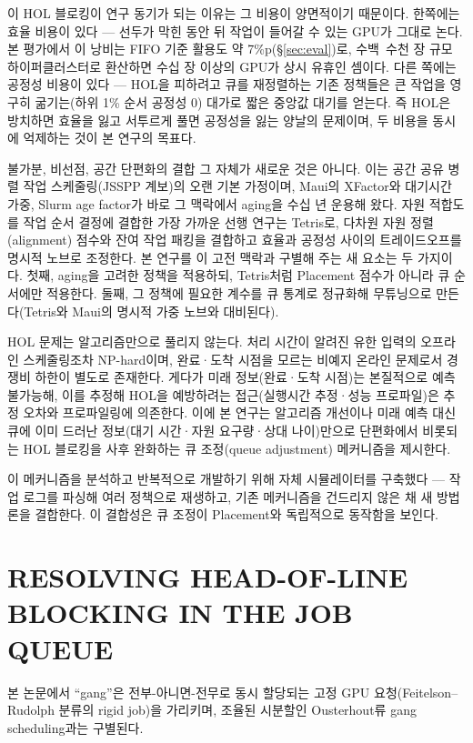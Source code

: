\documentclass{ieeetj}
\begin{document}
이 HOL 블로킹이 연구 동기가 되는 이유는 그 비용이 양면적이기 때문이다. 한쪽에는 효율 비용이 있다 --- 선두가 막힌 동안 뒤 작업이 들어갈 수 있는 GPU가 그대로 논다. 본 평가에서 이 낭비는 FIFO 기준 활용도 약 7\%p(\S\ref{sec:eval})로, 수백~수천 장 규모 하이퍼클러스터로 환산하면 수십 장 이상의 GPU가 상시 유휴인 셈이다. 다른 쪽에는 공정성 비용이 있다 --- HOL을 피하려고 큐를 재정렬하는 기존 정책들은 큰 작업을 영구히 굶기는(하위 1\% 순서 공정성 0) 대가로 짧은 중앙값 대기를 얻는다. 즉 HOL은 방치하면 효율을 잃고 서투르게 풀면 공정성을 잃는 양날의 문제이며, 두 비용을 동시에 억제하는 것이 본 연구의 목표다.

불가분, 비선점, 공간 단편화의 결합 그 자체가 새로운 것은 아니다. 이는 공간 공유 병렬 작업 스케줄링(JSSPP 계보\cite{feitelson1996toward})의 오랜 기본 가정이며, Maui의 XFactor와 대기시간 가중\cite{jackson2001maui}, Slurm age factor가 바로 그 맥락에서 aging을 수십 년 운용해 왔다. 자원 적합도를 작업 순서 결정에 결합한 가장 가까운 선행 연구는 Tetris\cite{grandl2014multi}로, 다차원 자원 정렬(alignment) 점수와 잔여 작업 패킹을 결합하고 효율과 공정성 사이의 트레이드오프를 명시적 노브로 조정한다. 본 연구를 이 고전 맥락과 구별해 주는 새 요소는 두 가지이다. 첫째, aging을 고려한 정책을 적용하되, Tetris처럼 Placement 점수가 아니라 큐 순서에만 적용한다. 둘째, 그 정책에 필요한 계수를 큐 통계로 정규화해 무튜닝으로 만든다(Tetris와 Maui의 명시적 가중 노브와 대비된다). 

HOL 문제는 알고리즘만으로 풀리지 않는다. 처리 시간이 알려진 유한 입력의 오프라인 스케줄링조차 NP-hard이며\cite{ullman1975np}, 완료·도착 시점을 모르는 비예지 온라인 문제로서 경쟁비 하한이 별도로 존재한다\cite{motwani1994nonclairvoyant}. 게다가 미래 정보(완료·도착 시점)는 본질적으로 예측 불가능해, 이를 추정해 HOL을 예방하려는 접근(실행시간 추정·성능 프로파일)은 추정 오차와 프로파일링에 의존한다. 이에 본 연구는 알고리즘 개선이나 미래 예측 대신 큐에 이미 드러난 정보(대기 시간·자원 요구량·상대 나이)만으로 단편화에서 비롯되는 HOL 블로킹을 사후 완화하는 큐 조정(queue adjustment) 메커니즘을 제시한다.

이 메커니즘을 분석하고 반복적으로 개발하기 위해 자체 시뮬레이터를 구축했다 --- 작업 로그를 파싱해 여러 정책으로 재생하고, 기존 메커니즘을 건드리지 않은 채 새 방법론을 결합한다. 이 결합성은 큐 조정이 Placement와 독립적으로 동작함을 보인다.

\section{RESOLVING HEAD-OF-LINE BLOCKING IN THE JOB QUEUE}\label{algo:intro}
본 논문에서 ``gang''은 전부-아니면-전무로 동시 할당되는 고정 GPU 요청(Feitelson--Rudolph 분류\cite{feitelson1996toward}의 rigid job)을 가리키며, 조율된 시분할인 Ousterhout류 gang scheduling\cite{ousterhout1982gang}과는 구별된다.
\end{document}

